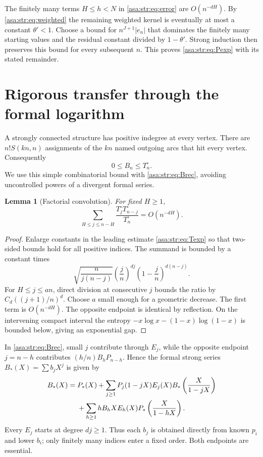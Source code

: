 \documentclass[11pt,letterpaper]{article}
\newtheorem{lemma}[theorem]{Lemma}
\theoremstyle{remark}\newtheorem{remark}[theorem]{Remark}
\numberwithin{equation}{section}
\begin{document}
The finitely many terms $H\le h<N$ in \eqref{asa:str:eq:error} are $O(n^{-dH})$. By \eqref{asa:str:eq:weighted} the remaining weighted kernel is eventually at most a constant $\theta'<1$. Choose a bound for $n^{J+1}|e_n|$ that dominates the finitely many starting values and the residual constant divided by $1-\theta'$. Strong induction then preserves this bound for every subsequent $n$. This proves \eqref{asa:str:eq:Pexp} with its stated remainder.

\section{Rigorous transfer through the formal logarithm}\label{asa:str:sec:transfer}
A strongly connected structure has positive indegree at every vertex. There are $n!S(kn,n)$ assignments of the $kn$ named outgoing arcs that hit every vertex. Consequently
\begin{equation}\label{asa:str:eq:boundB}
 0\le B_n\le T^{\circ}_n.
\end{equation}
We use this simple combinatorial bound with \eqref{asa:str:eq:Brec}, avoiding uncontrolled powers of a divergent formal series.

\begin{lemma}[Factorial convolution]\label{asa:str:lem:convolution}
For fixed $H\ge1$,
\begin{equation}\label{asa:str:eq:convolution}
 \sum_{H\le j\le n-H}\frac{T^{\circ}_jT^{\circ}_{n-j}}{T^{\circ}_n}=O(n^{-dH}).
\end{equation}
\end{lemma}
\begin{proof}
Enlarge constants in the leading estimate \eqref{asa:str:eq:Texp} so that two-sided bounds hold for all positive indices. The summand is bounded by a constant times
\[
 \sqrt{\frac n{j(n-j)}}
 \left(\frac jn\right)^{dj}
 \left(1-\frac jn\right)^{d(n-j)}.
\]
For $H\le j\le an$, direct division at consecutive $j$ bounds the ratio by $C_d((j+1)/n)^d$. Choose $a$ small enough for a geometric decrease. The first term is $O(n^{-dH})$. The opposite endpoint is identical by reflection. On the intervening compact interval the entropy $-x\log x-(1-x)\log(1-x)$ is bounded below, giving an exponential gap.
\end{proof}
In \eqref{asa:str:eq:Brec}, small $j$ contribute through $E_j$, while the opposite endpoint $j=n-h$ contributes $(h/n)B_hP_{n-h}$. Hence the formal strong series $B_*(X)=\sum b_jX^j$ is given by
\begin{align}
 B_*(X)={}&P_*(X)
 +\sum_{j\ge1}P_j(1-jX)E_j(X)
 B_*\left(\frac X{1-jX}\right)\notag\\
 &+\sum_{h\ge1}hB_hXE_h(X)
 P_*\left(\frac X{1-hX}\right).\label{asa:str:eq:Bformal}
\end{align}
Every $E_j$ starts at degree $dj\ge1$. Thus each $b_j$ is obtained directly from known $p_i$ and lower $b_i$; only finitely many indices enter a fixed order. Both endpoints are essential.
\end{document}
